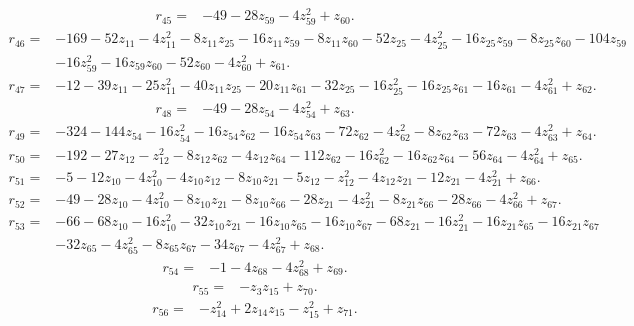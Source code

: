 \begin{align*}
 r_{45}={}&-49-28z_{59}-4z_{59}^{2}+z_{60} .
\end{align*}
\begin{align*}
 r_{46}={}&-169-52z_{11}-4z_{11}^{2}-8z_{11}z_{25}-16z_{11}z_{59}-8z_{11}z_{60}-52z_{25}-4z_{25}^{2}-16z_{25}z_{59}-8z_{25}z_{60}-104z_{59}\\
 &-16z_{59}^{2}-16z_{59}z_{60}-52z_{60}-4z_{60}^{2}+z_{61} .
\end{align*}
\begin{align*}
 r_{47}={}&-12-39z_{11}-25z_{11}^{2}-40z_{11}z_{25}-20z_{11}z_{61}-32z_{25}-16z_{25}^{2}-16z_{25}z_{61}-16z_{61}-4z_{61}^{2}+z_{62} .
\end{align*}
\begin{align*}
 r_{48}={}&-49-28z_{54}-4z_{54}^{2}+z_{63} .
\end{align*}
\begin{align*}
 r_{49}={}&-324-144z_{54}-16z_{54}^{2}-16z_{54}z_{62}-16z_{54}z_{63}-72z_{62}-4z_{62}^{2}-8z_{62}z_{63}-72z_{63}-4z_{63}^{2}+z_{64} .
\end{align*}
\begin{align*}
 r_{50}={}&-192-27z_{12}-z_{12}^{2}-8z_{12}z_{62}-4z_{12}z_{64}-112z_{62}-16z_{62}^{2}-16z_{62}z_{64}-56z_{64}-4z_{64}^{2}+z_{65} .
\end{align*}
\begin{align*}
 r_{51}={}&-5-12z_{10}-4z_{10}^{2}-4z_{10}z_{12}-8z_{10}z_{21}-5z_{12}-z_{12}^{2}-4z_{12}z_{21}-12z_{21}-4z_{21}^{2}+z_{66} .
\end{align*}
\begin{align*}
 r_{52}={}&-49-28z_{10}-4z_{10}^{2}-8z_{10}z_{21}-8z_{10}z_{66}-28z_{21}-4z_{21}^{2}-8z_{21}z_{66}-28z_{66}-4z_{66}^{2}+z_{67} .
\end{align*}
\begin{align*}
 r_{53}={}&-66-68z_{10}-16z_{10}^{2}-32z_{10}z_{21}-16z_{10}z_{65}-16z_{10}z_{67}-68z_{21}-16z_{21}^{2}-16z_{21}z_{65}-16z_{21}z_{67}\\
 &-32z_{65}-4z_{65}^{2}-8z_{65}z_{67}-34z_{67}-4z_{67}^{2}+z_{68} .
\end{align*}
\begin{align*}
 r_{54}={}&-1-4z_{68}-4z_{68}^{2}+z_{69} .
\end{align*}
\begin{align*}
 r_{55}={}&-z_{3}z_{15}+z_{70} .
\end{align*}
\begin{align*}
 r_{56}={}&-z_{14}^{2}+2z_{14}z_{15}-z_{15}^{2}+z_{71} .
\end{align*}
